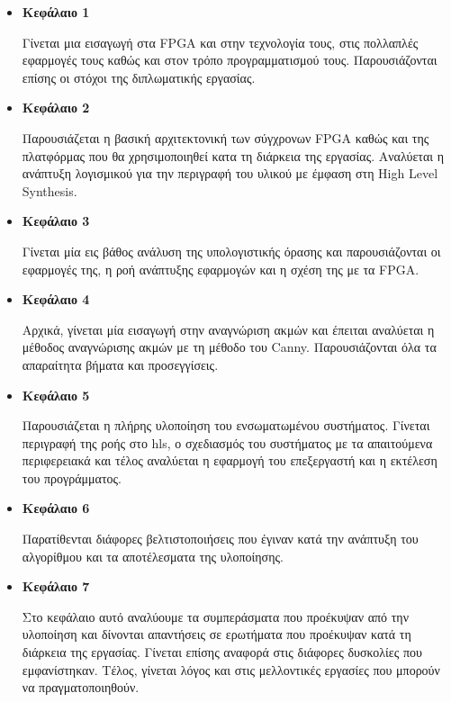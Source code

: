 \begin{itemize}[label={},leftmargin=*]
\item \textbf{Κεφάλαιο 1}

Γίνεται μια εισαγωγή στα FPGA και στην τεχνολογία τους, στις πολλαπλές εφαρμογές τους καθώς και στον τρόπο προγραμματισμού τους. Παρουσιάζονται επίσης οι στόχοι της διπλωματικής εργασίας. \\

\item \textbf{Κεφάλαιο 2}

Παρουσιάζεται η βασική αρχιτεκτονική των σύγχρονων FPGA καθώς και της πλατφόρμας που θα χρησιμοποιηθεί κατα τη διάρκεια της εργασίας. Αναλύεται η ανάπτυξη λογισμικού για την περιγραφή του υλικού με έμφαση στη High Level Synthesis.\\

\item \textbf{Κεφάλαιο 3}

Γίνεται μία εις βάθος ανάλυση της υπολογιστικής όρασης και παρουσιάζονται οι εφαρμογές της, η ροή ανάπτυξης εφαρμογών και η σχέση της με τα FPGA.\\

\item \textbf{Κεφάλαιο 4}

Αρχικά, γίνεται μία εισαγωγή στην αναγνώριση ακμών και έπειται αναλύεται η μέθοδος αναγνώρισης ακμών με τη μέθοδο του Canny. Παρουσιάζονται όλα τα απαραίτητα βήματα και προσεγγίσεις.

\item \textbf{Κεφάλαιο 5}

Παρουσιάζεται η πλήρης υλοποίηση του ενσωματωμένου συστήματος. Γίνεται περιγραφή της ροής στο \gls{hls}, ο σχεδιασμός του συστήματος με τα απαιτούμενα περιφερειακά και τέλος αναλύεται η εφαρμογή του επεξεργαστή και η εκτέλεση του προγράμματος. \\

\item \textbf{Κεφάλαιο 6}

Παρατίθενται διάφορες βελτιστοποιήσεις που έγιναν κατά την ανάπτυξη του αλγορίθμου και τα αποτέλεσματα της υλοποίησης. \\

\item \textbf{Κεφάλαιο 7}

Στο κεφάλαιο αυτό αναλύουμε τα συμπεράσματα που προέκυψαν από την υλοποίηση και δίνονται απαντήσεις σε ερωτήματα που προέκυψαν κατά τη διάρκεια της εργασίας. Γίνεται επίσης αναφορά στις διάφορες δυσκολίες που εμφανίστηκαν. Τέλος, γίνεται λόγος και στις μελλοντικές εργασίες που μπορούν να πραγματοποιηθούν.
\end{itemize}


